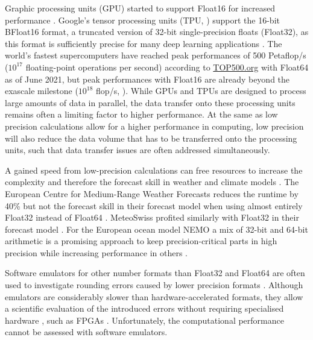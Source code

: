 Graphic processing units (GPU) started to support Float16 for increased performance \citep{Markidis2018}. Google's tensor processing
units (TPU, \cite{Jouppi2017,Jouppi2018}) support the 16-bit BFloat16 format, a truncated version of 32-bit single-precision floats (Float32),
as this format is sufficiently precise for many deep learning applications \citep{Kalamkar2019,Burgess2019,Gupta2015}. The world's fastest
supercomputers have reached peak performances of 500 Petaflop/s ($10^{17}$
floating-point operations per second) according to \href{https://top500.org}{TOP500.org} \citep{Dongarra2011} with Float64 as of June 2021,
but peak performances with Float16 are already beyond the exascale milestone ($10^{18}$ flop/s, \cite{Kurth2018,Kudo2020a}).
While GPUs and TPUs are designed to process large amounts of data in parallel, the data transfer onto these processing units remains often
a limiting factor to higher performance. At the same as low precision calculations allow for a higher performance in computing, low precision
will also reduce the data volume that has to be transferred onto the processing units, such that data transfer issues are often addressed
simultaneously.

A gained speed from low-precision calculations can free resources to increase the complexity and therefore the forecast skill in
weather and climate models \citep{Bauer2020}. The European Centre for Medium-Range Weather Forecasts reduces the runtime by
40\% but not the forecast skill in their forecast model when using almost entirely Float32 instead of Float64 \citep{Vana2017}. MeteoSwiss
profited similarly with Float32 in their forecast model \citep{Rudisuhli2013,Fuhrer2018}. For the European ocean model NEMO
\citep{Madec2017} a mix of 32-bit and 64-bit arithmetic is a promising approach to keep precision-critical parts in high precision while
increasing performance in others \citep{TintoPrims2019}.

Software emulators for other number formats than Float32 and Float64 are often used to investigate rounding errors caused by lower
precision formats \citep{Dawson2017}. Although emulators are considerably slower than hardware-accelerated formats, they allow a
scientific evaluation of the introduced errors without requiring specialised hardware \citep{Johnson2020}, such as FPGAs
\citep{Russell2017}. Unfortunately, the computational performance cannot be assessed with software emulators.

